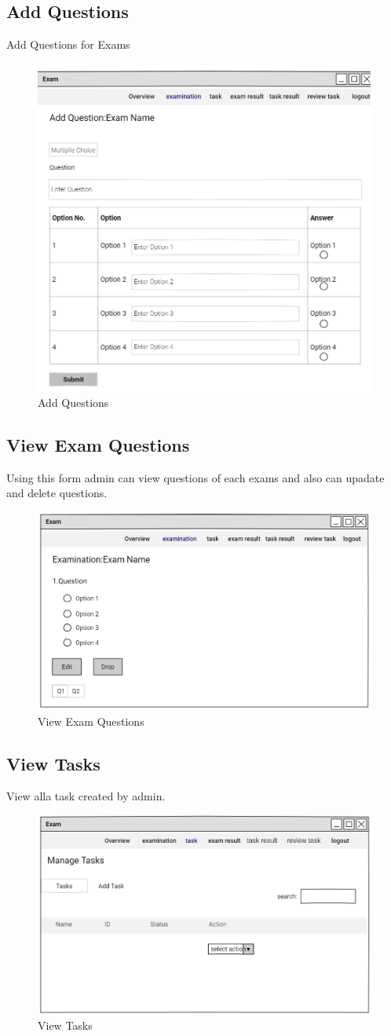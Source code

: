 \documentclass[a4paper,12pt]{report}
\begin{document}
\subsection {Add Questions}
Add Questions for Exams
\begin{figure}[bph]
	\centering
	\includegraphics[width=.5\linewidth]{img/admin/addexmqstn}
	\caption{Add Questions}
\end{figure}
\pagebreak
\subsection {View Exam  Questions}
Using this form admin can view questions of each exams and also can upadate and delete questions.
\begin{figure}[bph]
	\centering
	\includegraphics[width=.5\linewidth]{img/admin/viweexmqstn}
	\caption{View Exam  Questions}
\end{figure}

\subsection { View Tasks}
View alla task created by admin.
\begin{figure}[bph]
	\centering
	\includegraphics[width=.55\linewidth]{img/admin/t1}
	\caption{ View Tasks}
\end{figure}
\pagebreak
\end{document}
